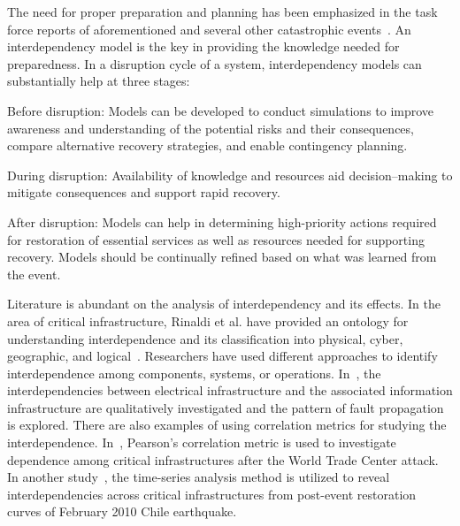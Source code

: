 \documentclass[12pt]{elsarticle}
\begin{document}
The need for proper preparation and planning has been emphasized in the task force reports of aforementioned and several other catastrophic events~\cite{FERC12,BeA04,A14Rp}. An interdependency model is the key in providing the knowledge needed for preparedness. In a disruption cycle of a system, interdependency models can substantially help at three stages:
\begin{basedescript}{\desclabelstyle{\pushlabel}}
  \item[Before disruption:] Models can be developed to conduct simulations to improve awareness and understanding of the potential risks and their consequences, compare alternative recovery strategies, and enable contingency planning.
  \item[During disruption:] Availability of knowledge and resources aid decision--making to mitigate consequences and support rapid recovery.
  \item[After disruption:] Models can help in determining high-priority actions required for restoration of essential services as well as resources needed for supporting recovery. Models should be continually refined based on what was learned from the event.
\end{basedescript}

Literature is abundant on the analysis of interdependency and its effects. In the area of critical infrastructure, Rinaldi et al. have provided an ontology for understanding interdependence and its classification into physical, cyber, geographic, and logical~\cite{RiP01}.
Researchers have used different approaches to identify interdependence among components, systems, or operations. In~\cite{LaK07}, the interdependencies between electrical infrastructure and the associated information infrastructure are qualitatively investigated and the pattern of fault propagation is explored. There are also examples of using correlation metrics for studying the interdependence. In~\cite{MeW06}, Pearson's correlation metric is used to investigate dependence among critical infrastructures after the World Trade Center attack. In another study~\cite{DuK12}, the time-series analysis method is utilized to reveal interdependencies across critical infrastructures from post-event restoration curves of February 2010 Chile earthquake. %
\end{document}
